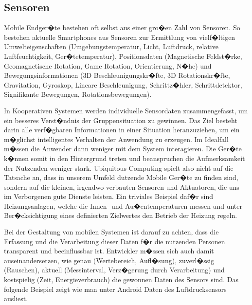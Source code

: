 \subsection{Sensoren}\label{sensorgeo}
Mobile Endger�te bestehen oft selbst aus einer gro�en Zahl von Sensoren. So bestehen aktuelle Smartphones aus Sensoren zur Ermittlung von vielf�ltigen Umwelteigenschaften (Umgebungstemperatur, Licht, Luftdruck, relative Luftfeuchtigkeit, Ger�tetemperatur), Positionsdaten (Magnetische Feldst�rke, Geomagnetische Rotation, Game Rotation, Orientierung, N�he) und Bewegungsinformationen (3D Beschleunigungskr�fte, 3D Rotationskr�fte, Gravitation, Gyroskop, Lineare Beschleunigung, Schrittz�hler, Schrittdetektor, Signifikante Bewegungen, Rotationsbewegungen).

In Kooperativen Systemen werden individuelle Sensordaten zusammengefasst, um ein besseres Verst�ndnis der Gruppensituation zu gewinnen. Das Ziel besteht darin alle verf�gbaren Informationen in einer Situation heranzuziehen, um ein m�glichst intelligentes Verhalten der Anwendung zu erzeugen. Im Idealfall m�ssen die Anwender dann weniger mit dem System interagieren. Die Ger�te k�nnen somit in den Hintergrund treten und beanspruchen die Aufmerksamkeit der Nutzenden weniger stark. Ubiquitous Computing spielt also nicht auf die Tatsache an, dass in unserem Umfeld dutzende Mobile Ger�te zu finden sind, sondern auf die kleinen, irgendwo verbauten Sensoren und Aktuatoren, die uns im Verborgenen gute Dienste leisten. Ein triviales Beispiel daf�r sind Heizungsanlagen, welche die Innen- und Au�entemperaturen messen und unter Ber�cksichtigung eines definierten Zielwertes den Betrieb der Heizung regeln. 

Bei der Gestaltung von mobilen Systemen ist darauf zu achten, dass die Erfassung und die Verarbeitung dieser Daten f�r die nutzenden Personen transparent und beeinflussbar ist. Entwickler m�ssen sich auch damit auseinandersetzen, wie genau (Wertebereich, Aufl�sung), zuverl�ssig (Rauschen), aktuell (Messinterval, Verz�gerung durch Verarbeitung) und kostspielig (Zeit, Energieverbrauch) die gewonnen Daten des Sensors sind. Das folgende Beispiel zeigt wie man unter Android Daten des Luftdrucksensors ausliest. 

\begin{comment}
Resolution / precision
Accuracy
Sample rates
Delay
Range
Noise
Reliability
Cost
\end{comment}

